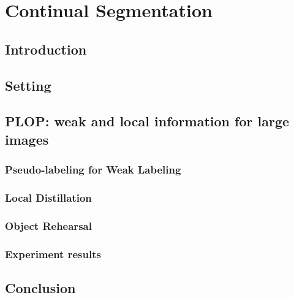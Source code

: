 \chapter{Continual Segmentation}
\label{chapter:segmentation}

{}


\section{Introduction}

\section{Setting}

\section{PLOP: weak and local information for large images}

\subsection{Pseudo-labeling for Weak Labeling}

\subsection{Local Distillation}

\subsection{Object Rehearsal}

\subsection{Experiment results}

\section{Conclusion}

